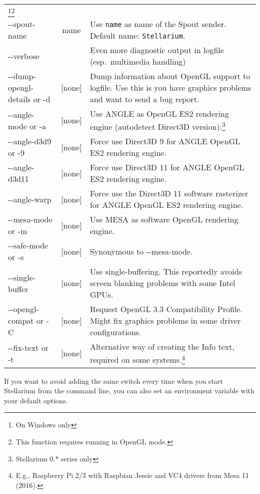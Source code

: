 \begin{longtable}{l|c|p{68mm}}
                                    \footnote{On Windows only}\footnote{This function requires running in OpenGL mode.}\\
-\/-spout-name       & name       & Use \texttt{name} as name of the Spout sender. Default name: \texttt{Stellarium}.\footnotemark[1]\\\midrule									
-\/-verbose          &            & Even more diagnostic output in logfile (esp.\ multimedia handling)\\
-\/-dump-opengl-details or -d     & {[}none{]} & Dump information about OpenGL support to logfile. 
                                                 Use this is you have graphics problems and want to send a bug report. \\\midrule
-\/-angle-mode or -a & {[}none{]} & Use ANGLE as OpenGL ES2 rendering engine (autodetect Direct3D version).\footnotemark[1]\footnote{Stellarium 0.* series only}\\
-\/-angle-d3d9 or -9 & {[}none{]} & Force use Direct3D 9 for ANGLE OpenGL ES2 rendering engine.\footnotemark[1]\footnotemark[3]\\
-\/-angle-d3d11      & {[}none{]} & Force use Direct3D 11 for ANGLE OpenGL ES2 rendering engine.\footnotemark[1]\footnotemark[3]\\
-\/-angle-warp       & {[}none{]} & Force use the Direct3D 11 software rasterizer for ANGLE OpenGL ES2 rendering engine.\footnotemark[1]\footnotemark[3]\\
-\/-mesa-mode or -m  & {[}none{]} & Use MESA as software OpenGL rendering engine.\footnotemark[1]\\
-\/-safe-mode or -s  & {[}none{]} & Synonymous to -\/-mesa-mode.\footnotemark[1]\\
-\/-single-buffer    & {[}none{]} & Use single-buffering. This reportedly avoids screen blanking problems with some Intel GPUs. \\
-\/-opengl-compat or -C & {[}none{]} & Request OpenGL 3.3 Compatibility Profile. Might fix graphics problems in some driver configurations.\\
-\/-fix-text or -t   & {[}none{]} & Alternative way of creating the Info text, required on some systems.\footnote{E.g., Raspberry Pi 2/3 with Raspbian Jessie and VC4 drivers from Mesa 11 (2016).}\\\bottomrule
\end{longtable}

\noindent {} If you want to avoid adding the same
switch every time when you start Stellarium from the command line, you
can also set an environment variable  with your
default options. 

